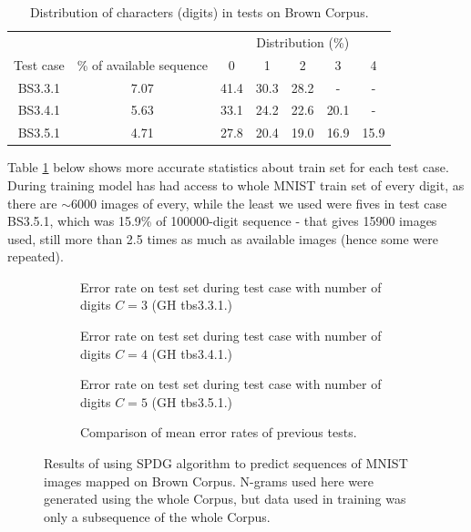 \documentclass[declaration,shortabstract,lic,english]{iithesis}
\begin{document}
\begin{table}[h]
\centering
\begin{tabular}{c|c|c|c|c|c|c|}
    \multicolumn{2}{c}{} & \multicolumn{5}{|c|}{Distribution (\%)} \\
    \cline{3-7}
    Test case & \% of available sequence & 0 & 1 & 2 & 3 & 4 \\
    \hline
    BS3.3.1 & 7.07 & 41.4 & 30.3 & 28.2 & - & - \\
    BS3.4.1 & 5.63 & 33.1 & 24.2 & 22.6 & 20.1 & - \\
    BS3.5.1 & 4.71 & 27.8 & 20.4 & 19.0 & 16.9 & 15.9 \\
\end{tabular}
\caption{Distribution of characters (digits) in tests on Brown Corpus.}
\label{tab:tbs3(345)1_stats}
\end{table}

Table \ref{tab:tbs3(345)1_stats} below shows more accurate statistics about train set for each test case. During training model has had access to whole MNIST train set of every digit, as there are $\sim6000$ images of every, while the least we used were fives in test case BS3.5.1, which was 15.9\% of 100000-digit sequence - that gives 15900 images used, still more than 2.5 times as much as available images (hence some were repeated).


\begin{figure}[ht]
\begin{subfigure}[b]{.49\textwidth}
    \def\svgwidth{\textwidth}
    
    \caption{Error rate on test set during test case with number of digits $C=3$ (GH tbs3.3.1.)}
    \label{fig:tbs331_test_error}
\end{subfigure}
\begin{subfigure}[b]{.49\textwidth}
    \def\svgwidth{\textwidth}
    
    \caption{Error rate on test set during test case with number of digits $C=4$ (GH tbs3.4.1.)}
    \label{fig:tbs341_test_error}
\end{subfigure}
\begin{subfigure}[b]{.49\textwidth}
    \def\svgwidth{\textwidth}
    
    \caption{Error rate on test set during test case with number of digits $C=5$ (GH tbs3.5.1.)}
    \label{fig:tbs351_test_error}
\end{subfigure}
\begin{subfigure}[b]{.49\textwidth}
    \def\svgwidth{\textwidth}
    
    \caption{Comparison of mean error rates of previous tests.}
    \label{fig:tbs3(345)1_mean_test_error}
\end{subfigure}
\caption{Results of using SPDG algorithm to predict sequences of MNIST images mapped on Brown Corpus. N-grams used here were generated using the whole Corpus, but data used in training was only a subsequence of the whole Corpus.}
\label{fig:tbs1_results}
\end{figure}
\end{document}
